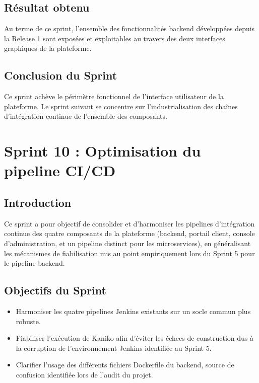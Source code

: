 \subsection{Résultat obtenu}

Au terme de ce sprint, l'ensemble des fonctionnalités backend développées depuis la Release 1 sont exposées et exploitables au travers des deux interfaces graphiques de la plateforme.

\subsection{Conclusion du Sprint}

Ce sprint achève le périmètre fonctionnel de l'interface utilisateur de la plateforme. Le sprint suivant se concentre sur l'industrialisation des chaînes d'intégration continue de l'ensemble des composants.


\section{Sprint 10 : Optimisation du pipeline CI/CD}

\subsection{Introduction}

Ce sprint a pour objectif de consolider et d'harmoniser les pipelines d'intégration continue des quatre composants de la plateforme (backend, portail client, console d'administration, et un pipeline distinct pour les microservices), en généralisant les mécanismes de fiabilisation mis au point empiriquement lors du Sprint 5 pour le pipeline backend.

\subsection{Objectifs du Sprint}

\begin{itemize}
    \item Harmoniser les quatre pipelines Jenkins existants sur un socle commun plus robuste.
    \item Fiabiliser l'exécution de Kaniko afin d'éviter les échecs de construction dus à la corruption de l'environnement Jenkins identifiée au Sprint 5.
    \item Clarifier l'usage des différents fichiers Dockerfile du backend, source de confusion identifiée lors de l'audit du projet.
\end{itemize}

